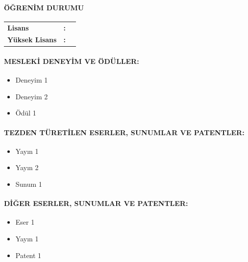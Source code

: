 \documentclass[a4paper,oneside,12pt]{report}
\begin{document}
\paragraph{ÖĞRENİM DURUMU}

\begin{table}[h]
	\begin{tabular}{lcr}  %
		\textbf{Lisans}&\textbf{:}&  \\  %
		\textbf{Yüksek Lisans}&\textbf{:}& 
	\end{tabular}
\end{table}

\paragraph{MESLEKİ DENEYİM VE ÖDÜLLER:}
\begin{itemize}
	\item Deneyim 1
	\item Deneyim 2
	\item Ödül 1
\end{itemize}

\paragraph{TEZDEN TÜRETİLEN ESERLER, SUNUMLAR VE PATENTLER:}
\begin{itemize}
	\item Yayın 1
	\item Yayın 2
	\item Sunum 1
\end{itemize}

\paragraph{DİĞER ESERLER, SUNUMLAR VE PATENTLER:}
\begin{itemize}
	\item Eser 1
	\item Yayın 1
	\item Patent 1
\end{itemize}
\end{document}

